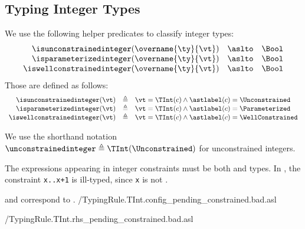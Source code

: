\subsection{Typing Integer Types\label{sec:TypingIntegerTypes}}
\hypertarget{def-isunconstrainedinteger}{}
\hypertarget{def-isparameterizedinteger}{}
\hypertarget{def-iswellconstrainedinteger}{}
We use the following helper predicates to classify integer types:
\[
  \begin{array}{rcl}
  \isunconstrainedinteger(\overname{\ty}{\vt}) &\aslto& \Bool\\
  \isparameterizedinteger(\overname{\ty}{\vt}) &\aslto& \Bool\\
  \iswellconstrainedinteger(\overname{\ty}{\vt}) &\aslto& \Bool
  \end{array}
\]
Those are defined as follows:
\[
  \begin{array}{rcl}
  \isunconstrainedinteger(\vt) &\triangleq& \vt = \TInt(c) \land \astlabel(c)=\Unconstrained\\
  \isparameterizedinteger(\vt) &\triangleq& \vt = \TInt(c) \land \astlabel(c)=\Parameterized\\
  \iswellconstrainedinteger(\vt) &\triangleq& \vt = \TInt(c) \land \astlabel(c)=\WellConstrained\\
\end{array}
\]
    

\hypertarget{def-unconstrainedinteger}{}
We use the shorthand notation $\unconstrainedinteger \triangleq \TInt(\Unconstrained)$
for unconstrained integers.

The expressions appearing in integer constraints must be both
\symbolicallyevaluableterm{} and \constrainedintegerterm{} types.
%
In , the constraint
\verb|x..x+1| is ill-typed, since \texttt{x} is not \symbolicallyevaluableterm{}.

and 
correspond to .
{\typingtests/TypingRule.TInt.config_pending_constrained.bad.asl}

{\typingtests/TypingRule.TInt.rhs_pending_constrained.bad.asl}

